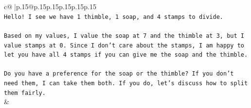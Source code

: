 \documentclass{article}
\begin{document}
{\begin{supertabular}{c@{$\;$}|p{.15\linewidth}@{}p{.15\linewidth}p{.15\linewidth}p{.15\linewidth}p{.15\linewidth}p{.15\linewidth}}
{{{\\ 
\texttt{Hello! I see we have 1 thimble, 1 soap, and 4 stamps to divide.} \\
\\ 
\texttt{Based on my values, I value the soap at 7 and the thimble at 3, but I value stamps at 0. Since I don't care about the stamps, I am happy to let you have all 4 stamps if you can give me the soap and the thimble.} \\
\\ 
\texttt{Do you have a preference for the soap or the thimble? If you don't need them, I can take them both. If you do, let's discuss how to split them fairly.} \\
            }
        }
    }
    & \\ \\


\end{supertabular}}
\end{document}
